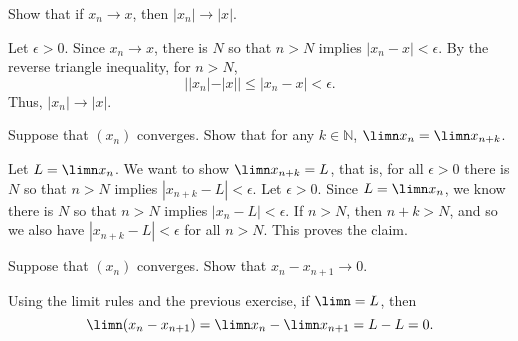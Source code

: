 \documentclass[11pt,dvipsnames]{book}
\numberwithin{figure}{section} %
\numberwithin{table}{section} %
\begin{document}
\begin{exercise}
Show that if $x_n\rightarrow x$, then $|x_n|\rightarrow |x|$.

\begin{solution}
Let $\epsilon>0$. Since $x_n\rightarrow x$, there is $N$ so that $n> N$ implies $|x_{n}-x|<\epsilon$. By the reverse triangle inequality, for $n> N$,
\[
||x_{n}|-|x||
\leq |x_{n}-x|<\epsilon.
\]
Thus, $|x_n|\rightarrow |x|$.
\end{solution}

\end{exercise}

\begin{exercise}\label{68}
Suppose that $(x_{n})$ converges. Show that  for any $k\in\mathbb{N}$, $\limn x_{n}= \limn x_{n+k}$.

\begin{solution}
Let $L=\limn x_{n}$. We want to show $\limn x_{n+k}=L$, that is, for all $\epsilon>0$ there is $N$ so that $n> N$ implies $|x_{n+k}-L|<\epsilon$. Let $\epsilon>0$. Since $L=\limn x_{n}$, we know there is $N$ so that $n> N$ implies $|x_{n}-L|<\epsilon$. If $n> N$, then $n+k>N$, and so we also have $|x_{n+k}-L|<\epsilon$ for all $n> N$. This proves the claim.
\end{solution}
\end{exercise}

\begin{exercise}
Suppose that $(x_{n})$ converges. Show that $x_{n}-x_{n+1}\rightarrow 0$.

\begin{solution}
Using the limit rules and the previous exercise, if $\limn =L$, then
\[
\limn(x_{n}-x_{n+1})
=\limn x_n - \limn x_{n+1} = L-L=0.
\]
\end{solution}
\end{exercise}
%
%
%
\end{document}
